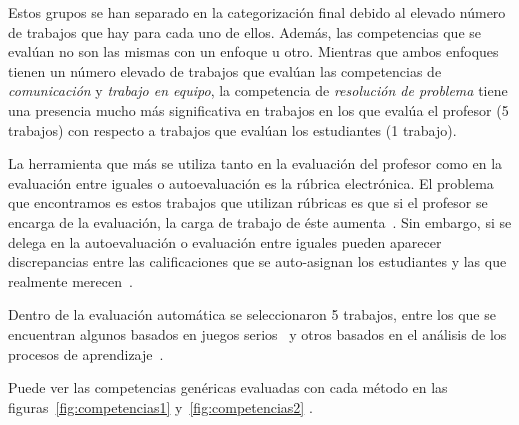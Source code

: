 Estos grupos se han separado en la categorización final debido al elevado número de trabajos que hay para cada uno de ellos. Además, las competencias que se evalúan no son las mismas con un enfoque u otro. Mientras que ambos enfoques tienen un número elevado de trabajos que evalúan las competencias de \emph{comunicación} y \emph{trabajo en equipo}, la competencia de \emph{resolución de problema} tiene una presencia mucho más significativa en trabajos en los que evalúa el profesor (5 trabajos) con respecto a trabajos que evalúan los estudiantes (1 trabajo).

La herramienta que más se utiliza tanto en la evaluación del profesor como en la evaluación entre iguales o autoevaluación es la rúbrica electrónica. El problema que encontramos es estos trabajos que utilizan rúbricas es que si el profesor se encarga de la evaluación, la carga de trabajo de éste aumenta~\cite{lacuesta2009active}. Sin embargo, si se delega en la autoevaluación o evaluación entre iguales pueden aparecer discrepancias entre las calificaciones que se auto-asignan los estudiantes y las que realmente merecen~\cite{carreras2013promotion}. 

Dentro de la evaluación automática se seleccionaron 5 trabajos, entre los que se encuentran algunos basados en juegos serios~\cite{djaouti2011classifying,bedek2011behavioral} y otros basados en el análisis de los procesos de aprendizaje~\cite{rayon2014web,fidalgo:2015}.

Puede ver las competencias genéricas evaluadas con cada método en las figuras~\ref{fig:competencias1} y~\ref{fig:competencias2} .

